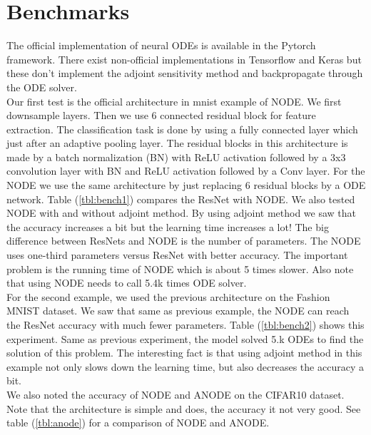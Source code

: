 \documentclass{article}
\newcommand\pef[1]{(\ref{#1})}
\begin{document}
	
	
	\section{Benchmarks}
	
	The official implementation of neural ODEs is available in the Pytorch framework. There exist non-official implementations in Tensorflow and Keras but these don't implement the adjoint sensitivity method and backpropagate through the ODE solver.
	\\
	
	Our first test is the official architecture in mnist example of NODE. We first downsample  layers. Then we use 6 connected residual block for feature extraction. The classification task is done by using a fully connected layer which just after an adaptive pooling layer. The residual blocks in this architecture is made by a batch normalization (BN) with ReLU activation followed by a 3x3 convolution layer with BN and ReLU activation followed by a Conv layer. For the NODE we use the same architecture by just replacing 6 residual blocks by a ODE network. Table \pef{tbl:bench1} compares the ResNet with NODE. We also tested NODE with and without adjoint method. By using adjoint method we saw that the accuracy increases a bit but the learning time increases a lot! The big difference between ResNets and NODE is the number of parameters. The NODE uses one-third parameters versus ResNet with better accuracy. The important problem is the running time of NODE which is about 5 times slower. Also note that using NODE needs to call 5.4k times ODE solver. 
	\\
	
	For the second example, we used the previous architecture on the Fashion MNIST dataset. We saw that same as previous example, the NODE can reach the ResNet accuracy with much fewer parameters.	Table \pef{tbl:bench2} shows this experiment. Same as previous experiment, the model solved 5.k ODEs to find the solution of this problem. The interesting fact is that using adjoint method in this example not only slows down the learning time, but also decreases the accuracy a bit.
	\\	
	
	We also noted the accuracy of NODE and ANODE on the CIFAR10 dataset. Note that the architecture is simple and does, the accuracy it not very good. See table \pef{tbl:anode} for a comparison of NODE and ANODE. 
	
\end{document}
